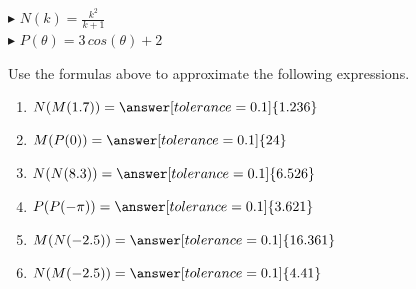 \documentclass{ximera}
\begin{document}
$\blacktriangleright$ $N(k) = \frac{k^2}{k + 1}$ \\

$\blacktriangleright$ $P(\theta) = 3 \, cos(\theta) + 2$










\begin{question}


Use the formulas above to approximate the following expressions.



\begin{enumerate}

\item $N(M(1.7)) = \answer[tolerance=0.1]{1.236}$ \\

\item $M(P(0)) = \answer[tolerance=0.1]{24}$ \\

\item $N(N(8.3)) = \answer[tolerance=0.1]{6.526}$ \\

\item $P(P(-\pi)) = \answer[tolerance=0.1]{3.621}$ \\

\item $M(N(-2.5)) = \answer[tolerance=0.1]{16.361}$ \\

\item $N(M(-2.5)) = \answer[tolerance=0.1]{4.41}$ \\

\end{enumerate}



\end{question}
\end{document}
